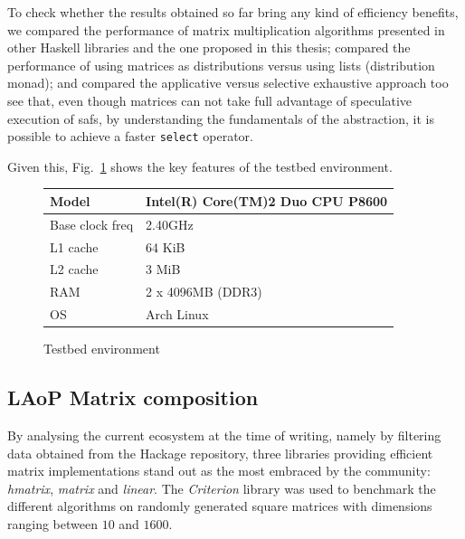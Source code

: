\documentclass[
  oneside,
  11pt, a4paper,
  footinclude=true,
  headinclude=true,
  cleardoublepage=empty
]{scrbook}
\theoremstyle{definition}
\theoremstyle{definition}
\begin{document}
        To check whether the results obtained so far bring any kind of efficiency benefits, we compared the performance of matrix multiplication algorithms presented in other Haskell libraries and the one proposed in this thesis; compared the performance of using matrices as distributions versus using lists (distribution monad); and compared the applicative versus selective exhaustive approach too see that, even though matrices can not take full advantage of speculative execution of \glspl{saf}, by understanding the fundamentals of the abstraction, it is possible to achieve a faster \texttt{select} operator.

        Given this, Fig.~\ref{tab:testbed} shows the key features of the testbed environment.
        \begin{figure}[H]%
        \centering\small
        \begin{tabular}{|l|l|}
        \hline
        Model & Intel(R) Core(TM)2 Duo CPU P8600 \\ \hline
        Base clock freq & 2.40GHz \\ \hline
        L1 cache & 64 KiB \\ \hline
        L2 cache & 3 MiB \\ \hline
        RAM & 2 x 4096MB (DDR3) \\ \hline
        OS & Arch Linux \\ \hline
        \end{tabular}
        \caption{Testbed environment \label{tab:testbed}}
        \end{figure}
        
        \subsection{LAoP Matrix composition}
        
    By analysing the current ecosystem at the time of writing, namely by filtering data obtained from the Hackage repository, three libraries providing efficient matrix implementations stand out as the most embraced by the community: \emph{hmatrix}, \emph{matrix} and \emph{linear}. The \emph{Criterion} library was used to benchmark the different algorithms on randomly generated square matrices with dimensions ranging between $10$ and $1600$.
    
\end{document}
